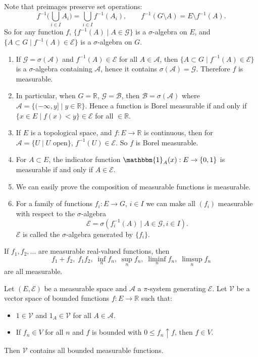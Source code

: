 \documentclass[12pt]{article}
\begin{document}
Note that preimages preserve set operations:
\[
f^{-1} \Biggl( \bigcup_{i \in I} A_i \Biggr) = \bigcup_{i \in I} f^{-1}(A_i), \qquad f^{-1}(G \setminus A) = E \setminus f^{-1}(A).
\]
So for any function $f$, $\{f^{-1}(A) \mid A \in \mathcal{G}\}$ is a $\sigma$-algebra on $E$, and $\{A \subset G \mid f^{-1}(A) \in \mathcal{E}\}$ is a $\sigma$-algebra on $G$.

\begin{exbox}
	\begin{enumerate}
		\item If $\mathcal{G} = \sigma(\mathcal{A})$ and $f^{-1}(A) \in \mathcal{E}$ for all $A \in \mathcal{A}$, then $\{A \subset G \mid f^{-1}(A) \in \mathcal{E}\}$ is a $\sigma$-algebra containing $\mathcal{A}$, hence it contains $\sigma(\mathcal{A}) = \mathcal{G}$. Therefore $f$ is measurable.
		\item In particular, when $G = \mathbb{R}$, $\mathcal{G} = \mathcal{B}$, then $\mathcal{B} = \sigma(\mathcal{A})$ where $\mathcal{A} = \{(-\infty, y] \mid y \in \mathbb{R}\}$. Hence a function is Borel measurable if and only if $\{x \in E \mid f(x) < y\} \in \mathcal{E}$ for all $ \in \mathbb{R}$.
		\item If $E$ is a topological space, and $f : E \to \mathbb{R}$ is continuous, then for $\mathcal{A} = \{U \mid U \text{ open}\}$, $f^{-1}(U) \in \mathcal{E}$. So $f$ is Borel measurable.
		\item For $A \subset E$, the indicator function $\mathbbm{1}_{A}(x) : E \to \{0, 1\}$ is measurable if and only if $A \in \mathcal{E}$.
		\item We can easily prove the composition of measurable functions is measurable.
		\item For a family of functions $f_i : E \to G$, $i \in I$ we can make all $(f_i)$ measurable with respect to the $\sigma$-algebra
			\[
			\mathcal{E} = \sigma(f_i^{-1}(A) \mid A \in \mathcal{G}, i \in I).
			\]
			$\mathcal{E}$ is called the $\sigma$-algebra generated by $\{f_i\}$.
	\end{enumerate}
\end{exbox}

\begin{proposition}
	If $f_1, f_2, \ldots$ are measurable real-valued functions, then
	\[
	f_1+f_2,\; f_1f_2,\; \inf_n f_n,\; \sup_n f_n,\; \liminf_n f_n,\; \limsup_n f_n
	\]
	are all measurable.
\end{proposition}

\begin{theorem}
	Let $(E, \mathcal{E})$ be a measurable space and $\mathcal{A}$ a $\pi$-system generating $\mathcal{E}$. Let $\mathcal{V}$ be a vector space of bounded functions $f : E \to \mathbb{R}$ such that:
	\begin{itemize}
		\item $1 \in \mathcal{V}$ and $1_A \in \mathcal{V}$ for all $A \in \mathcal{A}$.
		\item If $f_n \in V$ for all $n$ and $f$ is bounded with $0 \leq f_n \uparrow f$, then $f \in V$.
	\end{itemize}
	Then $\mathcal{V}$ contains all bounded measurable functions.
\end{theorem}
\end{document}
